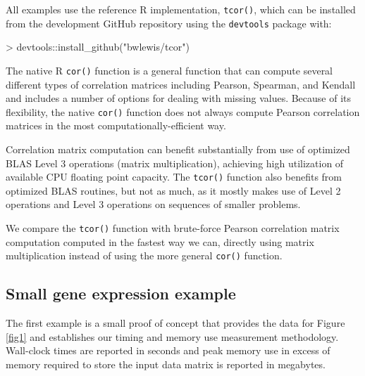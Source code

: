 \documentclass{article}
\let\proglang=\textsf
\numberwithin{algorithmctr}{section}
\begin{document}
All examples use the reference \proglang{R} implementation, {\tt tcor()}, which can be
installed from the development GitHub repository using the
{\tt devtools} package with:

\begin{Schunk}
\begin{Sinput}
> devtools::install_github("bwlewis/tcor")
\end{Sinput}
\end{Schunk}

The native \proglang{R} {\tt cor()} function is a general function that can
compute several different types of correlation matrices including Pearson,
Spearman, and Kendall and includes a number of options for dealing with missing
values.  Because of its flexibility, the native {\tt cor()} function does not
always compute Pearson correlation matrices in the most
computationally-efficient way.

Correlation matrix computation can benefit substantially from use of optimized
BLAS Level 3 operations (matrix multiplication), achieving high utilization of
available CPU floating point capacity. The {\tt tcor()} function also benefits
from optimized BLAS routines, but not as much, as it mostly makes use of Level
2 operations and Level 3 operations on sequences of smaller problems.

We compare the {\tt tcor()} function with brute-force Pearson correlation
matrix computation computed in the fastest way we can, directly using matrix
multiplication instead of using the more general {\tt cor()} function.


\subsection{Small gene expression example}

The first example is a small proof of concept that provides the data for Figure
\ref{fig1} and establishes our timing and memory use measurement methodology.
Wall-clock times are reported in seconds and peak memory use in excess of
memory required to store the input data matrix is reported in megabytes.
\end{document}
